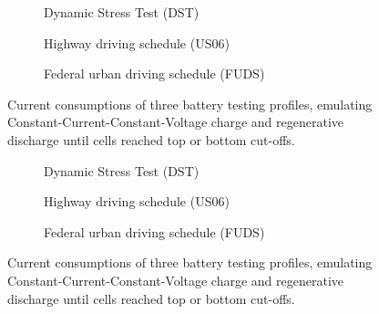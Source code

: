  {
\begin{figure}[htbp]
    \centering
    \begin{subfigure}[b]{0.35\textheight}
        \centering
        
        \caption{Dynamic Stress Test (DST)}
        \label{subfig:profs-DST}
    \end{subfigure}
    \hfill
    \begin{subfigure}[b]{0.35\textheight}
        \centering
        
        \caption{Highway driving schedule (US06)}
        \label{subfig:profs-US}
    \end{subfigure}
    \hfill
    \begin{subfigure}[b]{0.35\textheight}
        \centering
        
        \caption{Federal urban driving schedule (FUDS)}
        \label{subfig:profs-FUDS}
    \end{subfigure}
    \caption{Current consumptions of three battery testing profiles, emulating Constant-Current-Constant-Voltage charge and regenerative discharge until cells reached top or bottom cut-offs.}
    \label{fig:current-profs}
\end{figure}
} {
    \begin{figure}[htbp]
        \centering
        \begin{subfigure}[b]{\columnwidth}
            \centering
            
            \caption{Dynamic Stress Test (DST)}
            \label{subfig:profs-DST}
        \end{subfigure}
        \hfill
        \begin{subfigure}[b]{\columnwidth}
            \centering
            
            \caption{Highway driving schedule (US06)}
            \label{subfig:profs-US}
        \end{subfigure}
        \hfill
        \begin{subfigure}[b]{\columnwidth}
            \centering
            
            \caption{Federal urban driving schedule (FUDS)}
            \label{subfig:profs-FUDS}
        \end{subfigure}
        \caption{Current consumptions of three battery testing profiles, emulating Constant-Current-Constant-Voltage charge and regenerative discharge until cells reached top or bottom cut-offs.}
        \label{fig:current-profs}
    \end{figure}
}
